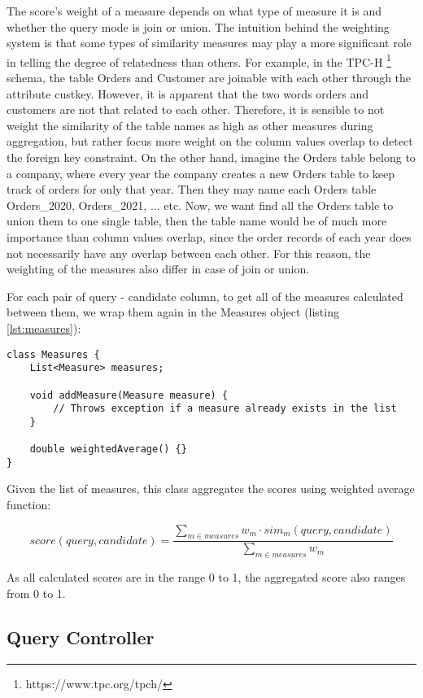 The score's weight of a measure depends on what type of measure it is and whether the query mode is join or union. The intuition behind the weighting system is that some types of similarity measures may play a more significant role in telling the degree of relatedness than others. For example, in the TPC-H \footnote{https://www.tpc.org/tpch/} schema, the table Orders and Customer are joinable with each other through the attribute custkey. However, it is apparent that the two words orders and customers are not that related to each other. Therefore, it is sensible to not weight the similarity of the table names as high as other measures during aggregation, but rather focus more weight on the column values overlap to detect the foreign key constraint. On the other hand, imagine the Orders table belong to a company, where every year the company creates a new Orders table to keep track of orders for only that year. Then they may name each Orders table Orders\_2020, Orders\_2021, ... etc. Now, we want find all the Orders table to union them to one single table, then the table name would be of much more importance than column values overlap, since the order records of each year does not necessarily have any overlap between each other. For this reason, the weighting of the measures also differ in case of join or union.

For each pair of query - candidate column, to get all of the measures calculated between them, we wrap them again in the Measures object (listing \ref{lst:measures}):

\begin{lstlisting}[caption=The Measures object, label=lst:measures]
class Measures {
    List<Measure> measures;

    void addMeasure(Measure measure) {
        // Throws exception if a measure already exists in the list
    }

    double weightedAverage() {}
}
\end{lstlisting}

Given the list of measures, this class aggregates the scores using weighted average function:

\[score(query, candidate) = \frac{\sum_{m \in measures} w_m \cdot sim_m(query, candidate)}{\sum_{m \in measures} w_m}\]

As all calculated scores are in the range 0 to 1, the aggregated score also ranges from 0 to 1.

\subsection{Query Controller}

